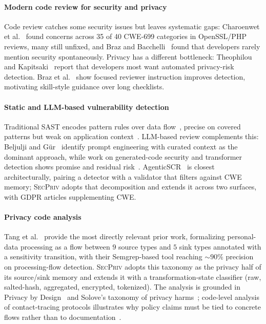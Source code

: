 \documentclass[runningheads]{llncs}
\begin{document}
\paragraph{Modern code review for security and privacy} Code review catches some security issues but leaves systematic gaps: Charoenwet et al.~\cite{charoenwet2024toward} found concerns across 35 of 40 CWE-699 categories in OpenSSL/PHP reviews, many still unfixed, and Braz and Bacchelli~\cite{braz2022sw_security} found that developers rarely mention security spontaneously. Privacy has a different bottleneck: Theophilou and Kapitsaki~\cite{theophilou2026privacy_survey} report that developers most want automated privacy-risk detection. Braz et al.~\cite{braz2022less} show focused reviewer instruction improves detection, motivating skill-style guidance over long checklists.

\paragraph{Static and LLM-based vulnerability detection} Traditional SAST encodes pattern rules over data flow~\cite{chess2004static,semgrep2023,avgustinov2016ql}, precise on covered patterns but weak on application context~\cite{christakis2016developers}. LLM-based review complements this: Beljulji and G\"ur~\cite{beljulji2025llmscr} identify prompt engineering with curated context as the dominant approach, while work on generated-code security and transformer detection shows promise and residual risk~\cite{pearce2022examining,thapa2022transformer}. AgenticSCR~\cite{charoenwet2026agenticscr} is closest architecturally, pairing a detector with a validator that filters against CWE memory; \textsc{SecPriv} adopts that decomposition and extends it across two surfaces, with GDPR articles supplementing CWE.

\paragraph{Privacy code analysis} Tang et al.~\cite{tang2023privacydata} provide the most directly relevant prior work, formalizing personal-data processing as a flow between $9$ source types and $5$ sink types annotated with a sensitivity transition, with their Semgrep-based tool reaching $\sim\!90\%$ precision on processing-flow detection. \textsc{SecPriv} adopts this taxonomy as the privacy half of its source/sink memory and extends it with a transformation-state classifier (raw, salted-hash, aggregated, encrypted, tokenized). The analysis is grounded in Privacy by Design~\cite{cavoukian2009privacy} and Solove's taxonomy of privacy harms~\cite{solove2006taxonomy}; code-level analysis of contact-tracing protocols illustrates why policy claims must be tied to concrete flows rather than to documentation~\cite{cicala2021pure}.
\end{document}
